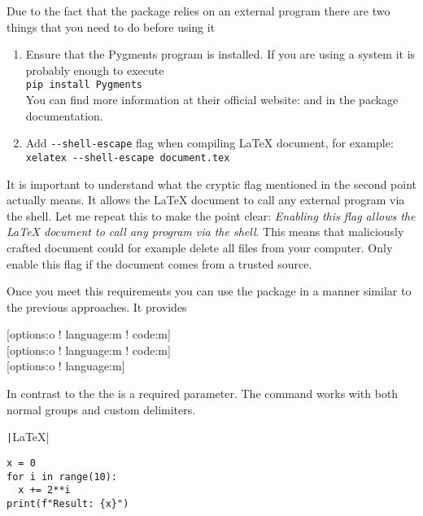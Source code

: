 Due to the fact that the  package relies on an external program
there are two things that you need to do before using it
\begin{enumerate}
  \item Ensure that the Pygments program is installed. If you are using a
        \Unix{} system it is probably enough to execute\\
        \verb|pip install Pygments|\\
        You can find more information at their official website:
         and in the  package documentation.

  \item
        Add \verb|--shell-escape| flag when compiling \LaTeX{} document, for
        example:\\
        \verb|xelatex --shell-escape document.tex|
\end{enumerate}
It is important to understand what the cryptic flag mentioned in the second
point actually means. It allows the \LaTeX{} document to call any external program via
the shell. Let me repeat this to make the point clear: \emph{Enabling this flag
  allows the \LaTeX{} document to call any program via the shell}. This means that
maliciously crafted document could for example delete all files from your
computer. Only enable this flag if the document comes from a trusted source.

Once you meet this requirements you can use the package in a manner similar to
the previous approaches. It provides
\begin{lscommand}
  [options:o ! language:m ! code:m] \\
  [options:o ! language:m ! code:m] \\
  [options:o ! language:m]
\end{lscommand}
In contrast to the  the  is a required parameter.
The command  works with both normal groups and custom
delimiters.
\begin{example}
\texttt|\LaTeX{}|

\begin{verbatim}
x = 0
for i in range(10):
  x += 2**i
print(f"Result: {x}")
\end{verbatim}

\inputminted{rust}{age.rs}
\end{example}

